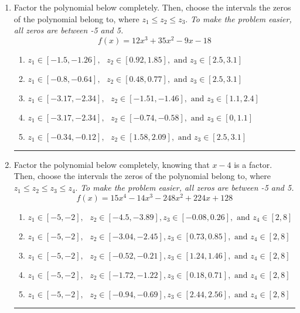 \documentclass[14pt]{extbook}
\newcommand{\litem}[1]{\item#1\hspace*{-1cm}\rule{\textwidth}{0.4pt}}
\begin{document}
\begin{enumerate}
{\begin{enumerate}[label=\Alph*.]
\end{enumerate} }
\litem{
Factor the polynomial below completely. Then, choose the intervals the zeros of the polynomial belong to, where $z_1 \leq z_2 \leq z_3$. \textit{To make the problem easier, all zeros are between -5 and 5.}\[ f(x) = 12x^{3} +35 x^{2} -9 x -18 \]\begin{enumerate}[label=\Alph*.]
\item \( z_1 \in [-1.5, -1.26], \text{   }  z_2 \in [0.92, 1.85], \text{   and   } z_3 \in [2.5, 3.1] \)
\item \( z_1 \in [-0.8, -0.64], \text{   }  z_2 \in [0.48, 0.77], \text{   and   } z_3 \in [2.5, 3.1] \)
\item \( z_1 \in [-3.17, -2.34], \text{   }  z_2 \in [-1.51, -1.46], \text{   and   } z_3 \in [1.1, 2.4] \)
\item \( z_1 \in [-3.17, -2.34], \text{   }  z_2 \in [-0.74, -0.58], \text{   and   } z_3 \in [0, 1.1] \)
\item \( z_1 \in [-0.34, -0.12], \text{   }  z_2 \in [1.58, 2.09], \text{   and   } z_3 \in [2.5, 3.1] \)

\end{enumerate} }
\litem{
Factor the polynomial below completely, knowing that $x -4$ is a factor. Then, choose the intervals the zeros of the polynomial belong to, where $z_1 \leq z_2 \leq z_3 \leq z_4$. \textit{To make the problem easier, all zeros are between -5 and 5.}\[ f(x) = 15x^{4} -14 x^{3} -248 x^{2} +224 x + 128 \]\begin{enumerate}[label=\Alph*.]
\item \( z_1 \in [-5, -2], \text{   }  z_2 \in [-4.5, -3.89], z_3 \in [-0.08, 0.26], \text{   and   } z_4 \in [2, 8] \)
\item \( z_1 \in [-5, -2], \text{   }  z_2 \in [-3.04, -2.45], z_3 \in [0.73, 0.85], \text{   and   } z_4 \in [2, 8] \)
\item \( z_1 \in [-5, -2], \text{   }  z_2 \in [-0.52, -0.21], z_3 \in [1.24, 1.46], \text{   and   } z_4 \in [2, 8] \)
\item \( z_1 \in [-5, -2], \text{   }  z_2 \in [-1.72, -1.22], z_3 \in [0.18, 0.71], \text{   and   } z_4 \in [2, 8] \)
\item \( z_1 \in [-5, -2], \text{   }  z_2 \in [-0.94, -0.69], z_3 \in [2.44, 2.56], \text{   and   } z_4 \in [2, 8] \)


\end{enumerate}}
\end{enumerate}
\end{document}
